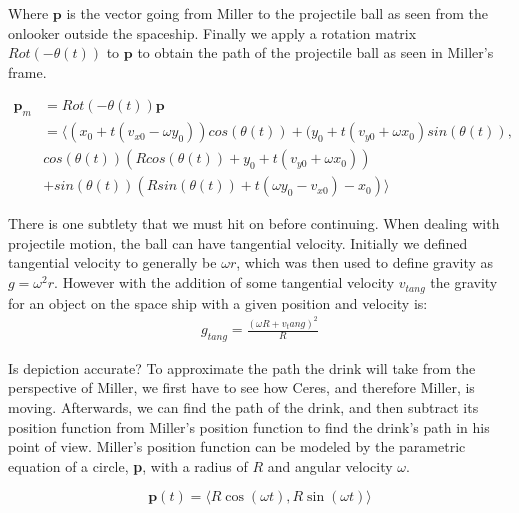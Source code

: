 \documentclass{amsart}
\renewcommand{\vec}{\textbf}
\theoremstyle{definition}
\begin{document}
Where $\vec{p}$ is the vector going from Miller to the projectile ball
as seen from the onlooker outside the spaceship. Finally we apply a
rotation matrix $Rot(-\theta(t))$ to $\vec{p}$ to obtain the path of
the projectile ball as seen in Miller's frame.

\begin{equation}\label{eq:ProjectileMillerFrame}
\begin{split}
    \vec{p}_m &= Rot(-\theta(t))\vec{p} \\
    &= \langle (x_0 + t(v_{x0} - \omega y_0)) cos(\theta(t)) + (y_0 +t(v_{y0} + \omega x_0) sin(\theta(t)),\\
    & cos(\theta(t)) (R cos(\theta(t)) + y_0 + t(v_{y0} + \omega x_0)) \\
    &+ sin(\theta(t))(R sin(\theta(t)) + t(\omega y_0 - v_{x0})-x_0) \rangle
\end{split}
\end{equation}

There is one subtlety that we must hit on before continuing. When
dealing with projectile motion, the ball can have tangential
velocity. Initially we defined tangential velocity to generally be
$\omega r$, which was then used to define gravity as $g = \omega^2 r$.
However with the addition of some tangential velocity $v_{tang}$ the
gravity for an object on the space ship with a given position and
velocity is:
\begin{equation}\label{eq:TangentGravity}
\begin{split}
    g_{tang} = \frac{(\omega R + v_tang)^2}{R}
\end{split}
\end{equation}

\hrulefill %

Is depiction accurate? To approximate the path the drink will take
from the perspective of Miller, we first have to see how Ceres, and
therefore Miller, is moving. Afterwards, we can find the path of the
drink, and then subtract its position function from Miller's position
function to find the drink's path in his point of view. Miller's
position function can be modeled by the parametric equation of a
circle, \vec{p}, with a radius of $R$ and angular velocity $\omega$.

\[
\vec{p}(t) = \langle R\cos(\omega t),R \sin(\omega t)\rangle
\]

\end{document}
